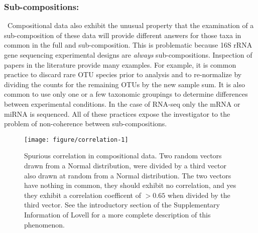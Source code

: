 \documentclass[11pt]{article}\usepackage[]{graphicx}\usepackage[]{color}
\makeatletter
\def\maxwidth{ %
  \ifdim\Gin@nat@width>\linewidth
    \linewidth
  \else
    \Gin@nat@width
  \fi
}
\newenvironment{knitrout}{}{} %
\makeatother
\begin{document}
%
%

\subsubsection{Sub-compositions:}~Compositional data also exhibit the unusual property that the examination of a sub-composition of these data will provide different answers for those taxa in common in the full and sub-composition\cite{Aitchison:1986}. This is problematic because 16S rRNA gene sequencing experimental designs are \emph{always} sub-compositions. Inspection of papers in the literature provide many examples. For example, it is common practice to discard rare OTU species prior to analysis and to re-normalize by dividing the counts for the remaining OTUs by the new sample sum. It is also common to use only one or a few taxonomic groupings to determine differences between experimental conditions. In the case of RNA-seq only the mRNA or miRNA is sequenced. All of these practices expose the investigator to the problem of non-coherence between sub-compositions.

\begin{figure}[!b]
\vspace{-2cm}
\begin{center}

\begin{knitrout}
\color{fgcolor}
\texttt{[image: figure/correlation-1]} 

\end{knitrout}
\caption{Spurious correlation in compositional data. Two random vectors drawn from a Normal distribution, were divided by a third vector also drawn at random from a Normal distribution. The two vectors have nothing in common, they should exhibit  no correlation, and yes they exhibit a correlation coefficent of $>0.65$ when divided by the third vector. See the introductory section of the Supplementary Information of Lovell\cite{Lovell:2015aa} for a more complete description of this phenomenon.  }
\label{correlation}
\end{center}
\end{figure}
\end{document}
